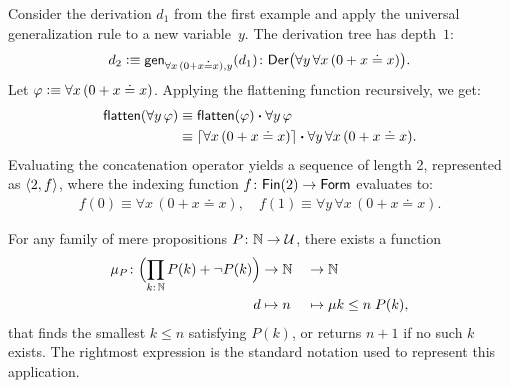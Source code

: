 \begin{xmpls}
\begin{description}[font=\normalfont\scshape]
        \item[Universal Generalization.]
        Consider the derivation $d_1$ from the first example and apply the universal generalization rule to a new variable~$y$. The derivation tree has depth~$1$:
        \[
            d_2\defeq
                \fun{gen}_{\forall x\,(0+x\doteq x),y}(d_1) \colon
                \fun{Der}\bigl(
                    \forall y\,\forall x\,(0+x\doteq x)
                \bigr).
        \]
        Let $\varphi\mathrel{\vcentcolon}\equiv\forall x\,(0+x\doteq x)$. Applying the flattening function recursively, we get:
        \begin{align*}
            \mathsf{flatten}(\forall y\,\varphi)
                &\equiv
                    \mathsf{flatten}(\varphi)
                    \mathbin{\boldsymbol{\cdot}}
                    \forall y\,\varphi\\
                &\equiv
                    {\lceil\forall x\,(0+x \doteq x)\rceil}
                    \mathbin{\boldsymbol{\cdot}}
                    \forall y\,\forall x\,(0+x\doteq x).
        \end{align*}
        Evaluating the concatenation operator yields a sequence of length 2, represented as $\langle2,f\rangle$, where the indexing function $f\colon\fun{Fin}(2)\to\fun{Form}$ evaluates to:
        \begin{align*}
            f(0)\equiv\forall x\,(0+x\doteq x),\quad
            f(1)\equiv\forall y\,\forall x\,(0+x\doteq x).
        \end{align*}
    \end{description}
\end{xmpls}

\begin{lem}
    \label{lem:muk<=n P(k)}
    For any family of mere propositions\/ $P\colon\N\to\univ$, there exists a function
    \begin{alignat*}{2}
        \mu_P\colon\Bigl(
            \prod_{k\colon\N}P(k)+\neg P(k)
        \Bigr)
        &\to\N&&\to\N\\
        d&\mapsto n&&\mapsto\mu k\le n\;P(k),
    \end{alignat*}
    that finds the smallest\/ $k\le n$ satisfying\/ $P(k)$, or returns\/ $n+1$ if no such\/ $k$ exists. The rightmost expression is the standard notation used to represent this application.
\end{lem}


